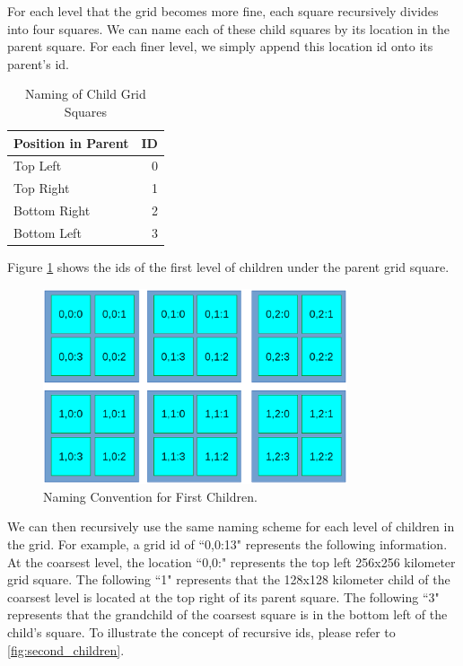 \documentclass[11pt]{article}
\begin{document}
For each level that the grid becomes more fine, each square recursively divides into four squares. We can name each of these child squares by its location in the parent square. For each finer level, we simply append this location id onto its parent's id.

\begin{table}[htbp]
	\caption{Naming of Child Grid Squares}
	\label{tab:grid_first_child}
	\begin{center}
		\begin{tabular}{|l|r|}
			\hline
			\textbf{Position in Parent} & \textbf{ID}\\
			\hline
			Top Left & 0\\
			\hline
			Top Right & 1\\
			\hline
			Bottom Right & 2\\
			\hline
			Bottom Left & 3\\
			\hline
		\end{tabular} 
	\end{center}
\end{table}

Figure \ref{fig:first_children} shows the ids of the first level of children under the parent grid square.

\begin{figure}[htbp]
	\centering
	\includegraphics[width=0.8\textwidth]{figures/grid-sq-1.eps}
	\caption{Naming Convention for First Children.}
	\label{fig:first_children}
\end{figure}

We can then recursively use the same naming scheme for each level of children in the grid. For example, a grid id of ``0,0:13" represents the following information. At the coarsest level, the location ``0,0:" represents the top left 256x256 kilometer grid square. The following ``1" represents that the 128x128 kilometer child of the coarsest level is located at the top right of its parent square. The following ``3" represents that the grandchild of the coarsest square is in the bottom left of the child's square. To illustrate the concept of recursive ids, please refer to \ref{fig:second_children}.
\end{document}
